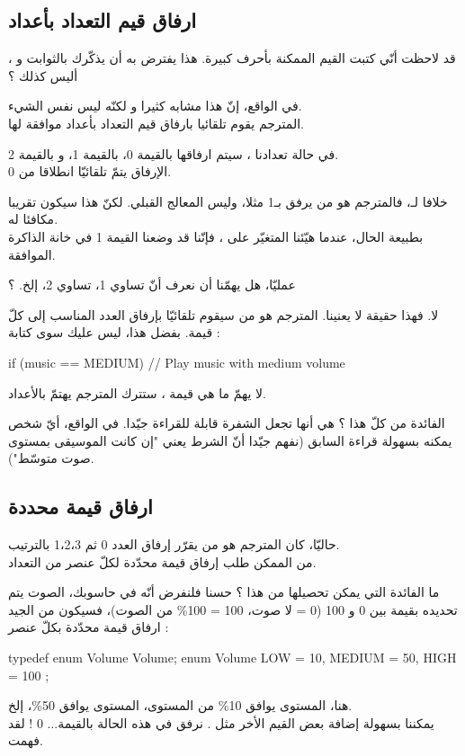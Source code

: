 \subsection{ارفاق قيم التعداد بأعداد}
قد لاحظت أنّي كتبت القيم الممكنة بأحرف كبيرة. هذا يفترض به أن يذكّرك بالثوابت و
،
أليس كذلك ؟

في الواقع، إنّ هذا مشابه كثيرا و لكنّه ليس نفس الشيء.\\
المترجم يقوم تلقائيا بارفاق قيم التعداد بأعداد موافقة لها.


في حالة تعدادنا
،
سيتم ارفاقها بالقيمة 0،
بالقيمة 1،
و
بالقيمة 2.\\
الإرفاق يتمّ تلقائيّا انطلاقا من 0.

خلافا لـ،
فالمترجم هو من يرفق
بـ1 مثلا، وليس المعالج القبلي. لكنّ هذا سيكون تقريبا مكافئا له.\\
بطبيعة الحال، عندما هيّئنا المتغيّر
على
،
فإنّنا قد وضعنا القيمة 1 في خانة الذاكرة الموافقة.

\begin{question}
عمليّا، هل يهمّنا أن نعرف أنّ
تساوي 1،
تساوي 2، إلخ. ؟
\end{question}

لا. فهذا حقيقة لا يعنينا. المترجم هو من سيقوم تلقائيّا بإرفاق العدد المناسب إلى كلّ قيمة. بفضل هذا، ليس عليك سوى كتابة :
\begin{Csource}
if (music == MEDIUM)
{
	// Play music with medium volume
}
\end{Csource}
لا يهمّ ما هي قيمة
،
ستترك المترجم يهتمّ بالأعداد.

الفائدة من كلّ  هذا ؟  هي أنها تجعل الشفرة قابلة للقراءة جيّدا. في الواقع، أيّ شخص يمكنه بسهولة قراءة
السابق (نفهم جيّدا أنّ الشرط يعني "إن كانت الموسيقى بمستوى صوت متوسّط").

\subsection{ارفاق قيمة محددة}
حاليّا، كان المترجم هو من يقرّر إرفاق العدد 0 ثم 1،2،3 بالترتيب.\\
من الممكن طلب إرفاق قيمة محدّدة لكلّ عنصر من التعداد.

ما الفائدة التي يمكن تحصيلها من هذا ؟ حسنا فلنفرض أنّه في حاسوبك، الصوت يتم تحديده بقيمة بين 0 و 100 (0 = لا صوت، 100 = 100\%
من الصوت)، فسيكون من الجيد ارفاق قيمة محدّدة بكلّ عنصر :
\begin{Csource}
typedef enum Volume Volume;
enum Volume
{
	LOW = 10, MEDIUM = 50, HIGH = 100
};
\end{Csource}
هنا، المستوى
يوافق 10\%
من المستوى، المستوى
يوافق 50\%،
إلخ.\\
يمكننا بسهولة إضافة بعض القيم الأخر مثل
.
نرفق في هذه الحالة
بالقيمة... 0 ! لقد فهمت.


